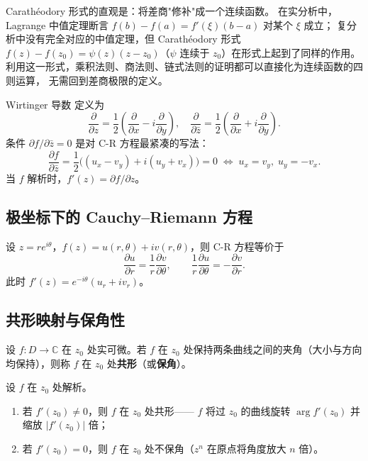 \begin{remark}
Carathéodory 形式的直观是：将差商"修补"成一个连续函数。
在实分析中，Lagrange 中值定理断言 $f(b)-f(a) = f'(\xi)(b-a)$ 对某个 $\xi$ 成立；
复分析中没有完全对应的中值定理，但 Carathéodory 形式
$f(z)-f(z_0) = \psi(z)(z-z_0)$（$\psi$ 连续于 $z_0$）在形式上起到了同样的作用。
利用这一形式，乘积法则、商法则、链式法则的证明都可以直接化为连续函数的四则运算，
无需回到差商极限的定义。
\end{remark}

\begin{remark}
Wirtinger 导数  定义为
\[
  \frac{\partial}{\partial z} = \frac12\left(\frac{\partial}{\partial x} - i\frac{\partial}{\partial y}\right), \quad
  \frac{\partial}{\partial \bar{z}} = \frac12\left(\frac{\partial}{\partial x} + i\frac{\partial}{\partial y}\right).
\]
条件 $\partial f / \partial \bar{z} = 0$ 是对 C-R 方程最紧凑的写法：
\[
  \frac{\partial f}{\partial \bar{z}} = \frac12\big((u_x - v_y) + i(u_y + v_x)\big) = 0
  \;\Longleftrightarrow\; u_x = v_y,\; u_y = -v_x.
\]
当 $f$ 解析时，$f'(z) = \partial f / \partial z$。
\end{remark}

\subsection{极坐标下的 Cauchy--Riemann 方程}

设 $z = re^{i\theta}$，$f(z) = u(r,\theta) + iv(r,\theta)$，则 C-R 方程等价于
\[
  \frac{\partial u}{\partial r} = \frac{1}{r}\frac{\partial v}{\partial \theta},
  \qquad
  \frac{1}{r}\frac{\partial u}{\partial \theta} = -\frac{\partial v}{\partial r}.
\]
此时 $f'(z) = e^{-i\theta}(u_r + iv_r)$。

\subsection{共形映射与保角性}

\begin{definition}
设 $f: D \to \mathbb{C}$ 在 $z_0$ 处实可微。若 $f$ 在 $z_0$ 处保持两条曲线之间的夹角（大小与方向均保持），则称 $f$ 在 $z_0$ 处\textbf{共形}（或\textbf{保角}）。
\end{definition}

\begin{theorem}[解析性与共形]
设 $f$ 在 $z_0$ 处解析。
\begin{enumerate}
  \item 若 $f'(z_0) \neq 0$，则 $f$ 在 $z_0$ 处共形——
    $f$ 将过 $z_0$ 的曲线旋转 $\arg f'(z_0)$ 并缩放 $|f'(z_0)|$ 倍；
  \item 若 $f'(z_0) = 0$，则 $f$ 在 $z_0$ 处不保角（$z^n$ 在原点将角度放大 $n$ 倍）。
\end{enumerate}
\end{theorem}


